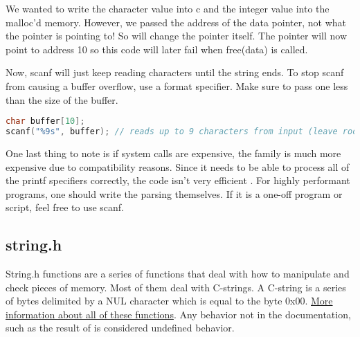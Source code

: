 We wanted to write the character value into c and the integer value into the malloc'd memory.
However, we passed the address of the data pointer, not what the pointer is pointing to!
So  will change the pointer itself.
The pointer will now point to address 10 so this code will later fail when free(data) is called.

Now, scanf will just keep reading characters until the string ends.
To stop scanf from causing a buffer overflow, use a format specifier.
Make sure to pass one less than the size of the buffer.

\begin{lstlisting}[language=C]
char buffer[10];
scanf("%9s", buffer); // reads up to 9 characters from input (leave room for the 10th byte to be the terminating byte)
\end{lstlisting}

One last thing to note is if system calls are expensive, the  family is much more expensive due to compatibility reasons.
Since it needs to be able to process all of the printf specifiers correctly, the code isn't very efficient .
For highly performant programs, one should write the parsing themselves.
If it is a one-off program or script, feel free to use scanf.

\subsection{string.h}

String.h functions are a series of functions that deal with how to manipulate and check pieces of memory.
Most of them deal with C-strings.
A C-string is a series of bytes delimited by a NUL character which is equal to the byte 0x00.
\href{https://linux.die.net/man/3/string}{More information about all of these functions}.
Any behavior not in the documentation, such as the result of  is considered undefined behavior.

